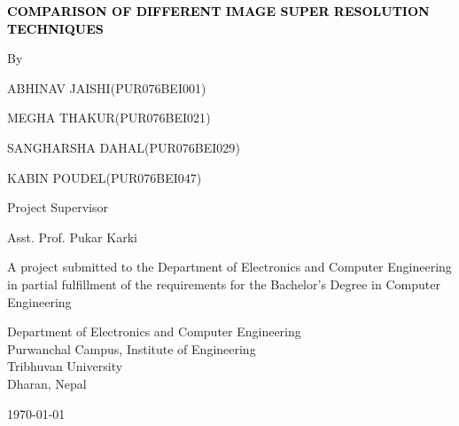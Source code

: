 \newpage
\thispagestyle{empty}
\begin{titlepage}
    \centering
{\fontsize{12pt}{14pt}\bfseries\textcolor{black}{COMPARISON OF DIFFERENT IMAGE SUPER RESOLUTION TECHNIQUES}\par}
\vspace{2.0cm}
       {By} \par {ABHINAV JAISHI}({PUR076BEI001})
            \par {MEGHA THAKUR}({PUR076BEI021})
            \par {SANGHARSHA DAHAL}({PUR076BEI029})
            \par {KABIN POUDEL}({PUR076BEI047})
       \vspace{2.0cm}\par
    Project Supervisor\par
    Asst. Prof. Pukar Karki\par
    \vspace{2.0cm}
    {A project submitted to the Department of Electronics and Computer Engineering in partial fulfillment of the requirements for the Bachelor’s Degree in Computer Engineering}\par
        \vspace{2.0cm}\par

    {Department of Electronics and Computer Engineering\\ Purwanchal Campus, Institute of Engineering \\ Tribhuvan University\\ Dharan, Nepal}\par
        \vspace{2.0cm}\par
        
        \today
\end{titlepage}